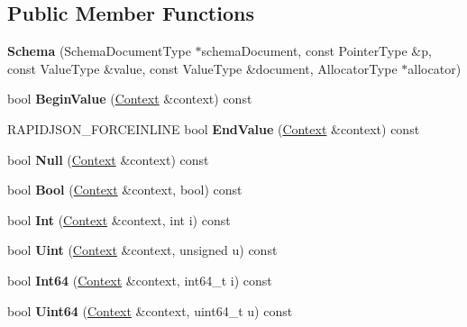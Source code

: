 \subsection*{Public Member Functions}
\begin{DoxyCompactItemize}
\item 
\mbox{\label{a02356_a31cbb5eaff43df83253f57d51585dc1d}} 
{\bfseries Schema} (Schema\+Document\+Type $\ast$schema\+Document, const Pointer\+Type \&p, const Value\+Type \&value, const Value\+Type \&document, Allocator\+Type $\ast$allocator)
\item 
\mbox{\label{a02356_ae978defa6c4210365bdb3571643a0d40}} 
bool {\bfseries Begin\+Value} (\hyperlink{a02380}{Context} \&context) const
\item 
\mbox{\label{a02356_afced5d191620cfdf0971fdd30b004686}} 
R\+A\+P\+I\+D\+J\+S\+O\+N\+\_\+\+F\+O\+R\+C\+E\+I\+N\+L\+I\+NE bool {\bfseries End\+Value} (\hyperlink{a02380}{Context} \&context) const
\item 
\mbox{\label{a02356_acd4fa9c33c9ef22a26ba160fdc1d78da}} 
bool {\bfseries Null} (\hyperlink{a02380}{Context} \&context) const
\item 
\mbox{\label{a02356_ab3d266cf235cf2f165952c0b8891a962}} 
bool {\bfseries Bool} (\hyperlink{a02380}{Context} \&context, bool) const
\item 
\mbox{\label{a02356_a1e3a87b01db90408be438dd4f5b8ee28}} 
bool {\bfseries Int} (\hyperlink{a02380}{Context} \&context, int i) const
\item 
\mbox{\label{a02356_abd42af9c38c9a02cda760567751fb00f}} 
bool {\bfseries Uint} (\hyperlink{a02380}{Context} \&context, unsigned u) const
\item 
\mbox{\label{a02356_a0190028fee83533e2b93f19ff5a99902}} 
bool {\bfseries Int64} (\hyperlink{a02380}{Context} \&context, int64\+\_\+t i) const
\item 
\mbox{\label{a02356_a1f80b1a9502b71530a98694e7b54987d}} 
bool {\bfseries Uint64} (\hyperlink{a02380}{Context} \&context, uint64\+\_\+t u) const
\item 
\mbox{\label{a02356_a8336bcea8d0e802c4b070da18e04f1dd}} 

\end{DoxyCompactItemize}
